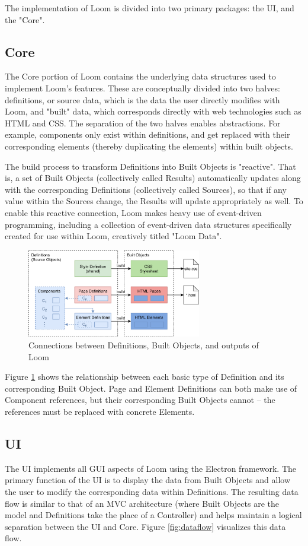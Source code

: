 \documentclass[conference, letterpaper]{IEEEtran}
\begin{document}
The implementation of Loom is divided into two primary packages: the UI, and the "Core".

\subsection{Core}
The Core portion of Loom contains the underlying data structures used to implement Loom's features. These are conceptually divided into two halves: definitions, or source data, which is the data the user directly modifies with Loom, and "built" data, which corresponds directly with web technologies such as HTML and CSS. The separation of the two halves enables abstractions. For example, components only exist within definitions, and get replaced with their corresponding elements (thereby duplicating the elements) within built objects.

The build process to transform Definitions into Built Objects is "reactive". That is, a set of Built Objects (collectively called Results) automatically updates along with the corresponding Definitions (collectively called Sources), so that if any value within the Sources change, the Results will update appropriately as well. To enable this reactive connection, Loom makes heavy use of event-driven programming, including a collection of event-driven data structures specifically created for use within Loom, creatively titled "Loom Data".

\begin{figure}[!t]
  \centering
  \includegraphics[width=3in]{../core.png}
  \caption{Connections between Definitions, Built Objects, and outputs of Loom}
  \label{fig:core}
\end{figure}

Figure \ref{fig:core} shows the relationship between each basic type of Definition and its corresponding Built Object. Page and Element Definitions can both make use of Component references, but their corresponding Built Objects cannot -- the references must be replaced with concrete Elements.

\subsection{UI}
The UI implements all GUI aspects of Loom using the Electron framework. The primary function of the UI is to display the data from Built Objects and allow the user to modify the corresponding data within Definitions. The resulting data flow is similar to that of an MVC architecture (where Built Objects are the model and Definitions take the place of a Controller) and helps maintain a logical separation between the UI and Core. Figure \ref{fig:dataflow} visualizes this data flow.
\end{document}
